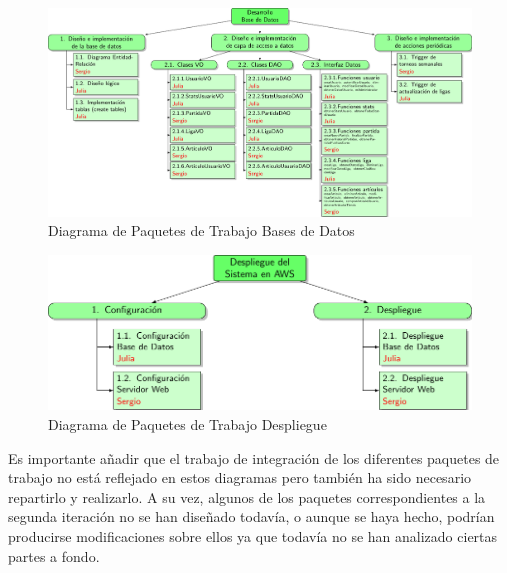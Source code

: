 \begin{figure}[H]
		\hspace{-2cm}
		\includegraphics[scale=0.8]{figuras/edtBasesDatos.pdf}
		\caption{Diagrama de Paquetes de Trabajo Bases de Datos}
	\end{figure}

\begin{figure}[H]
		\centering
		\includegraphics[scale=0.8]{figuras/edtDespliegue.pdf}
		\caption{Diagrama de Paquetes de Trabajo Despliegue}
	\end{figure}

Es importante añadir que el trabajo de integración de los diferentes paquetes de trabajo no está reflejado en estos diagramas pero también ha sido necesario repartirlo y realizarlo. A su vez, algunos de los paquetes correspondientes a la segunda iteración no se han diseñado todavía, o aunque se haya hecho, podrían producirse modificaciones sobre ellos ya que todavía no se han analizado ciertas partes a fondo.
